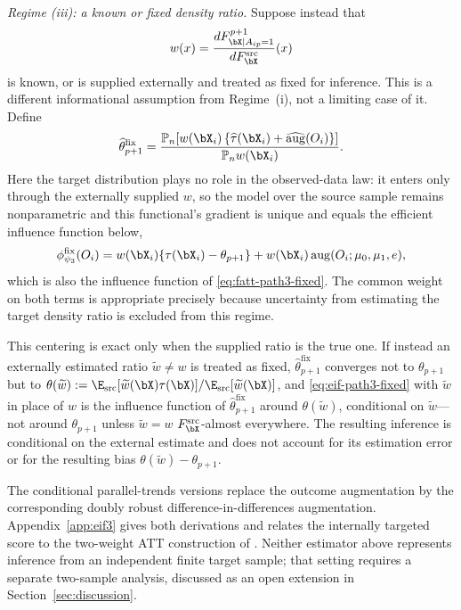 \documentclass{article}
\begin{document}
\emph{Regime (iii): a known or fixed density ratio.}
Suppose instead that
\[
w(x)
=
\frac{dF_{\bX\mid A_{ip}=1}^{p+1}}
     {dF_{\bX}^{\mathrm{src}}}(x)
\]
is known, or is supplied externally and treated as fixed for inference. This is a different informational assumption from Regime~(i), not a limiting case of it. Define
\begin{align}
\widehat{\theta}_{p+1}^{\mathrm{fix}}
=
\frac{
\mathbb{P}_n\!\left[
w(\bX_i)
\left\{
\widehat{\tau}(\bX_i)
+
\widehat{\operatorname{aug}}(O_i)
\right\}
\right]
}{
\mathbb{P}_n w(\bX_i)
}.
\label{eq:fatt-path3-fixed}
\end{align}
Here the target distribution plays no role in the observed-data law: it enters only through the externally supplied $w$, so the model over the source sample remains nonparametric and this functional's gradient is unique and equals the efficient influence function below,
\begin{align}
\phi_{\psi_3}^{\mathrm{fix}}(O_i)
=
w(\bX_i)\{\tau(\bX_i)-\theta_{p+1}\}
+
w(\bX_i)
\operatorname{aug}(O_i;\mu_0,\mu_1,e),
\label{eq:eif-path3-fixed}
\end{align}
which is also the influence function of \eqref{eq:fatt-path3-fixed}. The common weight on both terms is appropriate precisely because uncertainty from estimating the target density ratio is excluded from this regime.

This centering is exact only when the supplied ratio is the true one. If instead an externally estimated ratio $\widetilde w \neq w$ is treated as fixed, $\widehat{\theta}_{p+1}^{\mathrm{fix}}$ converges not to $\theta_{p+1}$ but to $\theta(\widetilde w) := \E_{\mathrm{src}}[\widetilde w(\bX)\tau(\bX)]/\E_{\mathrm{src}}[\widetilde w(\bX)]$, and \eqref{eq:eif-path3-fixed} with $\widetilde w$ in place of $w$ is the influence function of $\widehat{\theta}_{p+1}^{\mathrm{fix}}$ around $\theta(\widetilde w)$, conditional on $\widetilde w$---not around $\theta_{p+1}$ unless $\widetilde w = w$ $F_{\bX}^{\mathrm{src}}$-almost everywhere. The resulting inference is conditional on the external estimate and does not account for its estimation error or for the resulting bias $\theta(\widetilde w) - \theta_{p+1}$.

The conditional parallel-trends versions replace the outcome augmentation by the corresponding doubly robust difference-in-differences augmentation. Appendix~\ref{app:eif3} gives both derivations and relates the internally targeted score to the two-weight ATT construction of \citet{santannaDoublyRobustDifferenceindifferences2020}. Neither estimator above represents inference from an independent finite target sample; that setting requires a separate two-sample analysis, discussed as an open extension in Section~\ref{sec:discussion}.
\end{document}
